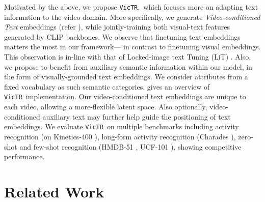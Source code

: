 \documentclass[10pt,twocolumn,letterpaper]{article}
\newcommand{\ours}{\texttt{VicTR}}
\begin{document}
Motivated by the above, we propose \ours,~which focuses more on adapting text information to the video domain. More specifically, we generate \textit{Video-conditioned Text} embeddings (refer ), while jointly-training both visual-text features generated by CLIP \cite{radford2021clip} backbones. 
We observe that finetuning text embeddings matters the most in our framework--- in contrast to finetuning visual embeddings. This observation is in-line with that of Locked-image text Tuning (LiT) \cite{zhai2022lit}. Also, we propose to benefit from auxiliary semantic information within our model, in the form of visually-grounded text embeddings. We consider attributes from a fixed vocabulary as such semantic categories.  gives an overview of \ours~implementation. Our video-conditioned text embeddings are unique to each video, allowing a more-flexible latent space. Also optionally, video-conditioned auxiliary text may further help guide the positioning of text embeddings. We evaluate \ours~on multiple benchmarks including activity recognition (on Kinetics-400 \cite{kay2017kinetics}), long-form activity recognition (Charades \cite{sigurdsson2016hollywood}), zero-shot and few-shot recognition (HMDB-51 \cite{kuehne2011hmdb}, UCF-101 \cite{soomro2012ucf101}), showing competitive performance.


\section{Related Work}
\label{sec:related_work}
\end{document}
